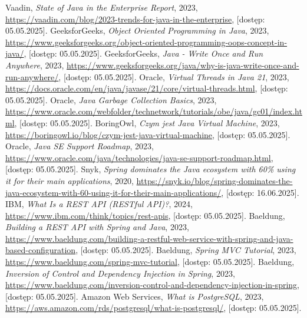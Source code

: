 \documentclass[a4paper,12pt,openany]{book}
\begin{document}
\begin{thebibliography}{99}
 Vaadin, \textit{State of Java in the Enterprise Report}, 2023, \url{https://vaadin.com/blog/2023-trends-for-java-in-the-enterprise}, [dostęp: 05.05.2025].
 GeeksforGeeks, \textit{Object Oriented Programming in Java}, 2023, \url{https://www.geeksforgeeks.org/object-oriented-programming-oops-concept-in-java/}, [dostęp: 05.05.2025].
 GeeksforGeeks, \textit{Java - Write Once and Run Anywhere}, 2023, \url{https://www.geeksforgeeks.org/java/why-is-java-write-once-and-run-anywhere/}, [dostęp: 05.05.2025].
 Oracle, \textit{Virtual Threads in Java 21}, 2023, \url{https://docs.oracle.com/en/java/javase/21/core/virtual-threads.html}, [dostęp: 05.05.2025].
 Oracle, \textit{Java Garbage Collection Basics}, 2023, \url{https://www.oracle.com/webfolder/technetwork/tutorials/obe/java/gc01/index.html}, [dostęp: 05.05.2025].
 BoringOwl, \textit{Czym jest Java Virtual Machine}, 2023, \url{https://boringowl.io/blog/czym-jest-java-virtual-machine}, [dostęp: 05.05.2025].
 Oracle, \textit{Java SE Support Roadmap}, 2023, \url{https://www.oracle.com/java/technologies/java-se-support-roadmap.html}, [dostęp: 05.05.2025].
 Snyk, \textit{Spring dominates the Java ecosystem with 60\% using it for their main applications}, 2020, \url{https://snyk.io/blog/spring-dominates-the-java-ecosystem-with-60-using-it-for-their-main-applications/}, [dostęp: 16.06.2025].
 IBM, \textit{What Is a REST API (RESTful API)?}, 2024, \url{https://www.ibm.com/think/topics/rest-apis}, [dostęp: 05.05.2025].
 Baeldung, \textit{Building a REST API with Spring and Java}, 2023, \url{https://www.baeldung.com/building-a-restful-web-service-with-spring-and-java-based-configuration}, [dostęp: 05.05.2025].
 Baeldung, \textit{Spring MVC Tutorial}, 2023, \url{https://www.baeldung.com/spring-mvc-tutorial}, [dostęp: 05.05.2025].
 Baeldung, \textit{Inversion of Control and Dependency Injection in Spring}, 2023, \url{https://www.baeldung.com/inversion-control-and-dependency-injection-in-spring}, [dostęp: 05.05.2025].
 Amazon Web Services, \textit{What is PostgreSQL}, 2023, \url{https://aws.amazon.com/rds/postgresql/what-is-postgresql/}, [dostęp: 05.05.2025].

\end{thebibliography}
\end{document}
